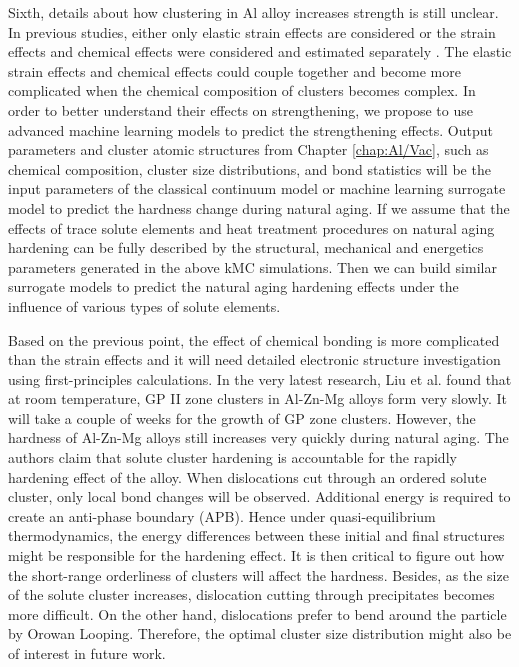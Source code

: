 Sixth, details about how clustering in Al alloy increases strength is still unclear. In previous studies, either only elastic strain effects are considered \cite{zhao2014cluster} or the strain effects and chemical effects were considered and estimated separately \cite{yasi2010first}. The elastic strain effects and chemical effects could couple together and become more complicated when the chemical composition of clusters becomes complex. In order to better understand their effects on strengthening, we propose to use advanced machine learning models to predict the strengthening effects. Output parameters and cluster atomic structures from Chapter \ref{chap:Al/Vac}, such as chemical composition, cluster size distributions, and bond statistics will be the input parameters of the classical continuum model or machine learning surrogate model to predict the hardness change during natural aging. If we assume that the effects of trace solute elements and heat treatment procedures on natural aging hardening can be fully described by the structural, mechanical and energetics parameters generated in the above \ac{kMC} simulations. Then we can build similar surrogate models to predict the natural aging hardening effects under the influence of various types of solute elements.

Based on the previous point, the effect of chemical bonding is more complicated than the strain effects and it will need detailed electronic structure investigation using first-principles calculations. In the very latest research, Liu et al. \cite{liu2020formation} found that at room temperature, \ac{GP} II zone clusters in Al-Zn-Mg alloys form very slowly. It will take a couple of weeks for the growth of \ac{GP} zone clusters. However, the hardness of Al-Zn-Mg alloys still increases very quickly during natural aging. The authors claim that solute cluster hardening is accountable for the rapidly hardening effect of the alloy. When dislocations cut through an ordered solute cluster, only local bond changes will be observed. Additional energy is required to create an anti-phase boundary (APB). Hence under quasi-equilibrium thermodynamics, the energy differences between these initial and final structures might be responsible for the hardening effect. It is then critical to figure out how the short-range orderliness of clusters will affect the hardness. Besides, as the size of the solute cluster increases, dislocation cutting through precipitates becomes more difficult. On the other hand, dislocations prefer to bend around the particle by Orowan Looping. Therefore, the optimal cluster size distribution might also be of interest in future work. 